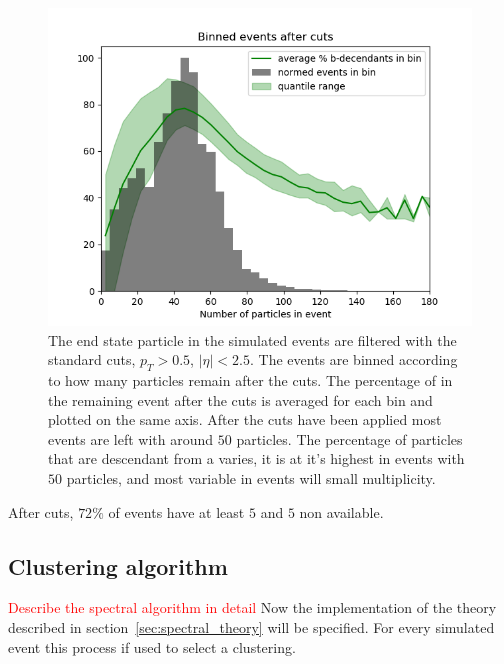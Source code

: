 \begin{figure}[htp]
    \begin{minipage}[c]{0.5\textwidth}
        \includegraphics[width=1\textwidth]{graphics/binned_events.png}
    \end{minipage}\hfill
    \begin{minipage}[c]{0.45\textwidth}
        \caption{The end state particle in the simulated events are filtered
            with the standard cuts, \(p_T > 0.5\), \(|\eta| < 2.5\).
            The events are binned according to how many particles remain after the cuts.
            The percentage of  in the remaining event after the cuts
            is averaged for each bin and plotted on the same axis.
            After the cuts have been applied most events are left with around \(50\) particles.
                 The percentage of particles that are descendant from a  varies,
                 it is at it's highest in events with \(50\) particles,
             and most variable in events will small multiplicity.}
    \end{minipage}
\end{figure}    

After cuts, \(72\%\) of events have at least \(5\)  and \(5\) non  available.

\subsection{Clustering algorithm}
\textcolor{red}{Describe the spectral algorithm in detail}
Now the implementation of the theory described in section~\ref{sec:spectral_theory} will be specified.
For every simulated event this process if used to select a clustering.

